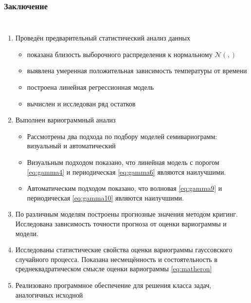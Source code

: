 \documentclass[10pt,pdf,aspectratio=169,hyperref={unicode},notheorems]{beamer}
\theoremstyle{definition}
\theoremstyle{example}
\theoremstyle{plain}
\newcommand{\inp}[1]{}
\newcommand{\descriptive}[2]{\inp{#1/descriptive/#2}}
\newcommand{\normaldistr}{$\mathcal{N}(\descriptive{original}{mean}, \descriptive{original}{variance})$}
\begin{document}
\begin{frame}
  \frametitle{Заключение}
  \setlength{\itemindent}{-.5in}
  \begin{columns}
  \column{6.2in}
  \vspace{-9pt}
  \begin{enumerate}
    \item Проведён предварительный статистический анализ данных
      \begin{itemize}
        \item показана близость выборочного распределения к нормальному \normaldistr
        \item выявлена умеренная положительная зависимость температуры от времени
        \item построена линейная регрессионная модель
        \item вычислен и исследован ряд остатков
      \end{itemize}
    \item Выполнен вариограммный анализ
      \begin{itemize}
        \item Рассмотрены два подхода по подбору моделей семивариограмм: \small{визуальный и автоматический}
        \item Визуальным подходом показано, что линейная модель с порогом \eqref{eq:gamma4} и периодическая \eqref{eq:gamma6} являются наилучшими.
        \item Автоматическим подходом показано, что волновая \eqref{eq:gamma9} и периодическая \eqref{eq:gamma10} являются наилучшими.
      \end{itemize}
    \item По различным моделям построены прогнозные значения методом кригинг. Исследована зависимость точности прогноза от оценки вариограммы и модели.
    \item Исследованы статистические свойства оценки вариограммы гауссовского случайного процесса. Показана несмещённость и состоятельность в среднеквадратическом смысле оценки вариограммы \eqref{eq:matheron}
    \item Реализовано программное обеспечение для решения класса задач, аналогичных исходной
  \end{enumerate}
  \end{columns}
\end{frame}
\end{document}
